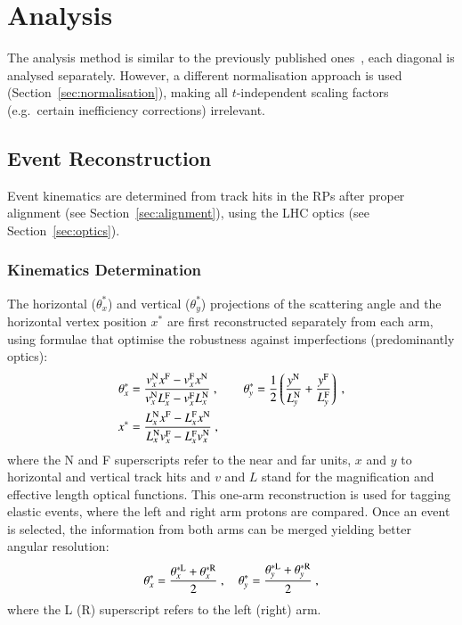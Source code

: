 \section{Analysis}

The analysis method is similar to the previously published ones~\cite{epl101-el,prl111}, each diagonal is analysed
separately. However, a different normalisation
approach is used (Section~\ref{sec:normalisation}), making all 
$t$-independent scaling factors (e.g.~certain inefficiency corrections)
irrelevant.




\subsection{Event Reconstruction}

Event kinematics are determined from track hits in the RPs after proper 
alignment (see Section~\ref{sec:alignment}), using the LHC optics 
(see Section~\ref{sec:optics}).


\subsubsection{Kinematics Determination}
\label{sec:kinematics}

The horizontal ($\theta_x^*$) and vertical ($\theta_y^*$) projections of the scattering angle and the horizontal vertex position $x^*$ are first reconstructed separately from each arm, using formulae that optimise the robustness against imperfections (predominantly optics):
\begin{equation}
\label{eq:kin 1a}
	\begin{aligned}
		\theta_x^* &= {v_x^{\rm N} x^{\rm F} - v_x^{\rm F} x^{\rm N}\over v_x^{\rm N} L_x^{\rm F} - v_x^{\rm F} L_x^{\rm N}}\ ,\qquad
		\theta_y^* = {1\over 2} \left( {y^{\rm N}\over L_y^{\rm N}} + {y^{\rm F}\over L_y^{\rm F}} \right)\ ,\\
		x^* &= {L_x^{\rm N} x^{\rm F} - L_x^{\rm F} x^{\rm N}\over L_x^{\rm N} v_x^{\rm F} - L_x^{\rm F} v_x^{\rm N}}\ , \\
	\end{aligned}
\end{equation}
where the N and F superscripts refer to the near and far units, $x$ and $y$ to horizontal and vertical track hits and $v$ and $L$ stand for the magnification and effective length optical functions. This one-arm reconstruction is used for tagging elastic events, where the left and right arm protons are compared. Once an event is selected, the information from both arms can be merged yielding better angular resolution:
\begin{equation}
\label{eq:kin 2a}
\theta_x^* = {\theta_x^{*\rm L} + \theta_x^{*\rm R} \over 2}\ ,\quad \theta_y^* = {\theta_y^{*\rm L} + \theta_y^{*\rm R} \over 2}\ ,
\end{equation}
where the L (R) superscript refers to the left (right) arm.


